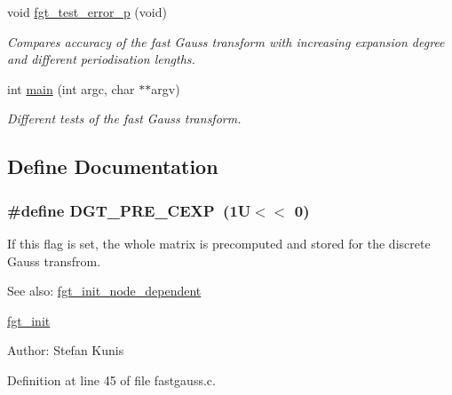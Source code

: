 \begin{CompactItemize}
void \hyperlink{group__applications__fastgauss_gb68ea529a033a478a391243d8dacf61b}{fgt\_\-test\_\-error\_\-p} (void)
\begin{CompactList}\small\item\em Compares accuracy of the fast Gauss transform with increasing expansion degree and different periodisation lengths. \item\end{CompactList}\item 
int \hyperlink{group__applications__fastgauss_g3c04138a5bfe5d72780bb7e82a18e627}{main} (int argc, char $\ast$$\ast$argv)
\begin{CompactList}\small\item\em Different tests of the fast Gauss transform. \item\end{CompactList}\end{CompactItemize}


\subsection{Define Documentation}
\hypertarget{group__applications__fastgauss_g48aa1ec81a29b9f079701246f0b53ccc}{
\subsubsection{\setlength{\rightskip}{0pt plus 5cm}\#define DGT\_\-PRE\_\-CEXP~(1U$<$$<$ 0)}}
\label{group__applications__fastgauss_g48aa1ec81a29b9f079701246f0b53ccc}


If this flag is set, the whole matrix is precomputed and stored for the discrete Gauss transfrom. 

\begin{Desc}
\item[See also:]\hyperlink{group__applications__fastgauss_g9d8f6229d33bc49f618838b21b3dd7fc}{fgt\_\-init\_\-node\_\-dependent} 

\hyperlink{group__applications__fastgauss_g44cf9a6fb0a16df875f613f343fd5c65}{fgt\_\-init} \end{Desc}
\begin{Desc}
\item[Author:]Stefan Kunis \end{Desc}


Definition at line 45 of file fastgauss.c.

